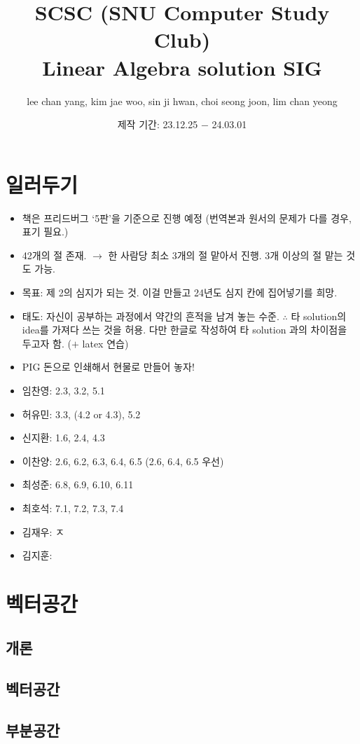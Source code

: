 \documentclass{oblivoir}
\title{SCSC (SNU Computer Study Club)\\Linear Algebra solution SIG}
\author{lee chan yang, kim jae woo, sin ji hwan, choi seong joon, lim chan yeong}
\date{제작 기간: 23.12.25 $-$ 24.03.01}
\begin{document}
\maketitle
\newpage
\section*{일러두기}
\begin{itemize}
    \item 책은 프리드버그 `5판'을 기준으로 진행 예정 (번역본과 원서의 문제가 다를 경우, 표기 필요.)
    \item 42개의 절 존재. $\rightarrow$ 한 사람당 최소 3개의 절 맡아서 진행. 3개 이상의 절 맡는 것도 가능.
    \item 목표: 제 2의 심지가 되는 것. 이걸 만들고 24년도 심지 칸에 집어넣기를 희망.
    \item 태도: 자신이 공부하는 과정에서 약간의 흔적을 남겨 놓는 수준. $\therefore$ 타 solution의 idea를 가져다 쓰는 것을 허용. 다만 한글로 작성하여 타 solution 과의 차이점을 두고자 함. ($+$ latex 연습)
    \item PIG 돈으로 인쇄해서 현물로 만들어 놓자!
    \item 임찬영: 2.3, 3.2, 5.1
    \item 허유민: 3.3, (4.2 or 4.3), 5.2
    \item 신지환: 1.6, 2.4, 4.3
    \item 이찬양: 2.6, 6.2, 6.3, 6.4, 6.5 (2.6, 6.4, 6.5 우선)
    \item 최성준: 6.8, 6.9, 6.10, 6.11
    \item 최호석: 7.1, 7.2, 7.3, 7.4 
    \item 김재우: ㅈ
    \item 김지훈:

\end{itemize}


\newpage
\tableofcontents



\newpage
\section{벡터공간}
\subsection{개론}
\subsection{벡터공간}
\subsection{부분공간}
\end{document}
